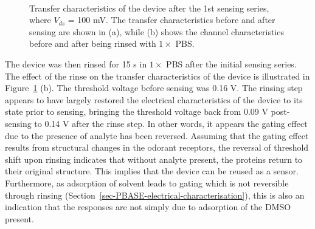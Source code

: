 \documentclass[
  a4paper,
]{scrbook}
\begin{document}
\begin{figure}
\begin{minipage}[t]{0.46\linewidth}
{{}

}

\end{minipage}%
%
\begin{minipage}[t]{0.01\linewidth}

{\centering 

~

}

\end{minipage}%

\caption{\label{fig-OR10a-TX-1}Transfer characteristics of the device
after the 1st sensing series, where \(V_{ds}\) = 100 mV. The transfer
characteristics before and after sensing are shown in (a), while (b)
shows the channel characteristics before and after being rinsed with
\(1 \times\) PBS.}

\end{figure}

The device was then rinsed for 15 s in \(1 \times\) PBS after the
initial sensing series. The effect of the rinse on the transfer
characteristics of the device is illustrated in
Figure~\ref{fig-OR10a-TX-1} (b). The threshold voltage before sensing
was 0.16 V. The rinsing step appears to have largely restored the
electrical characteristics of the device to its state prior to sensing,
bringing the threshold voltage back from 0.09 V post-sensing to 0.14 V
after the rinse step. In other words, it appears the gating effect due
to the presence of analyte has been reversed. Assuming that the gating
effect results from structural changes in the odorant receptors, the
reversal of threshold shift upon rinsing indicates that without analyte
present, the proteins return to their original structure. This implies
that the device can be reused as a sensor. Furthermore, as adsorption of
solvent leads to gating which is not reversible through rinsing
(Section~\ref{sec-PBASE-electrical-characterisation}), this is also an
indication that the responses are not simply due to adsorption of the
DMSO present.
\end{document}
